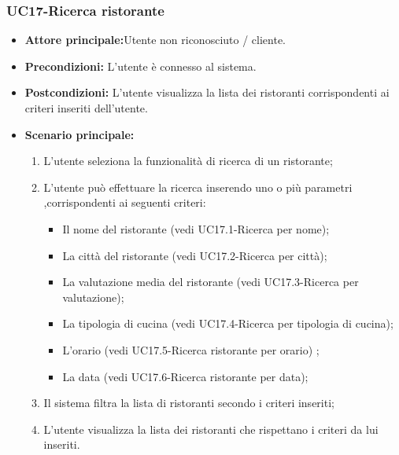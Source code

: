 \subsubsection{UC17-Ricerca ristorante}
\begin{itemize}
\item \textbf{Attore principale:}Utente non riconosciuto / cliente.
\item \textbf{Precondizioni:} L'utente è connesso al sistema.
\item \textbf{Postcondizioni:} L'utente visualizza la lista dei ristoranti corrispondenti ai criteri inseriti
dell'utente.
\item \textbf{Scenario principale:}
\begin{enumerate}
    \item L'utente seleziona la funzionalità di ricerca di un ristorante;
    \item L'utente può effettuare la ricerca inserendo uno o più parametri ,corrispondenti
    ai seguenti criteri:
    \begin{itemize}
        \item Il nome del ristorante (vedi UC17.1-Ricerca per nome);
        \item La città del ristorante (vedi UC17.2-Ricerca per città);
        \item La valutazione media del ristorante (vedi UC17.3-Ricerca per valutazione);
        \item La tipologia di cucina (vedi UC17.4-Ricerca per tipologia di cucina);
        \item L'orario (vedi UC17.5-Ricerca ristorante per orario) ;
        \item La data (vedi UC17.6-Ricerca ristorante per data); 
    \end{itemize}
    \item  Il sistema filtra la lista di ristoranti secondo i criteri inseriti;
    \item L'utente visualizza la lista dei ristoranti che rispettano i criteri da lui inseriti.
\end{enumerate}
\end{itemize}

